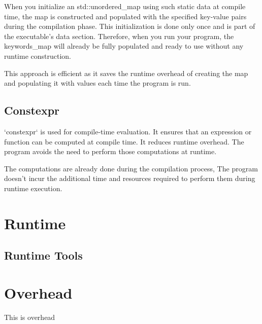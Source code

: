 When you initialize an std::unordered_map using such static data at compile time,
the map is constructed and populated with the specified key-value pairs during the compilation phase.
This initialization is done only once and is part of the executable's data section.
Therefore, when you run your program,
the keywords\_map will already be fully populated and ready to use without any runtime construction.

This approach is efficient as it saves the runtime overhead of creating the map
and populating it with values each time the program is run.


\subsection{Constexpr}

`constexpr` is used for compile-time evaluation.
It ensures that an expression or function can be computed at compile time.
It reduces runtime overhead.
The program avoids the need to perform those computations at runtime. 

The computations are already done during the compilation process, 
The program doesn't incur the additional time and resources required
to perform them during runtime execution.

\section{Runtime}

\subsection{Runtime Tools}


\section{Overhead}

This is overhead

